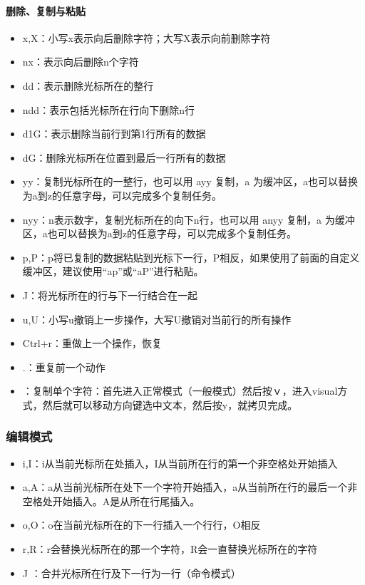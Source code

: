 {\paragraph{删除、复制与粘贴}
\begin{itemize}
\item x,X：小写x表示向后删除字符；大写X表示向前删除字符
\item nx：表示向后删除n个字符
\item dd：表示删除光标所在的整行
\item ndd：表示包括光标所在行向下删除n行
\item d1G：表示删除当前行到第1行所有的数据
\item dG：删除光标所在位置到最后一行所有的数据
\item yy：复制光标所在的一整行，也可以用 ayy 复制，a 为缓冲区，a也可以替换为a到z的任意字母，可以完成多个复制任务。
\item nyy：n表示数字，复制光标所在的向下n行，也可以用 anyy 复制，a 为缓冲区，a也可以替换为a到z的任意字母，可以完成多个复制任务。
\item p,P：p将已复制的数据粘贴到光标下一行，P相反，如果使用了前面的自定义缓冲区，建议使用“ap”或“aP”进行粘贴。
\item J：将光标所在的行与下一行结合在一起
\item u,U：小写u撤销上一步操作，大写U撤销对当前行的所有操作
\item Ctrl+r：重做上一个操作，恢复
\item .：重复前一个动作
\item ：复制单个字符：首先进入正常模式（一般模式）然后按ｖ，进入visual方式，然后就可以移动方向键选中文本，然后按y，就拷贝完成。
\end{itemize}


\subsubsection{编辑模式}
\begin{itemize}
\item i,I：i从当前光标所在处插入，I从当前所在行的第一个非空格处开始插入
\item a,A：a从当前光标所在处下一个字符开始插入，a从当前所在行的最后一个非空格处开始插入。A是从所在行尾插入。
\item o,O：o在当前光标所在的下一行插入一个行行，O相反
\item r,R：r会替换光标所在的那一个字符，R会一直替换光标所在的字符
\item J ：合并光标所在行及下一行为一行（命令模式）
\end{itemize}



}
